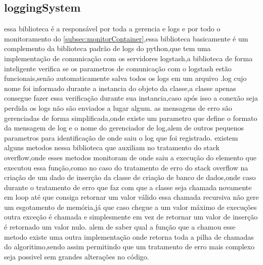 \documentclass[
	12pt,				%
	openright,			%
	oneside,			%
	a4paper,			%
	english,			%
	french,				%
	spanish,			%
	brazil,				%
	]{abntex2}
\begin{document}
\subsection{loggingSystem}
\label{subsec:loggingSystem}
essa biblioteca é a responsável por toda a gerencia e logs e por todo o monitoramento do \autoref{subsec:monitorContainer},essa biblioteca basicamente é um complemento da biblioteca padrão de logs do python,que tem uma implementação de comunicação com os servidores logstash,a biblioteca de forma inteligente verifica se os parametros de comunicação com o logstash estão funcionais,senão automaticamente salva todos os logs em um arquivo .log cujo nome foi informado durante a instancia do objeto da classe,a classe apenas consegue fazer essa verificação durante sua instancia,caso após isso a conexão seja perdida os logs não são enviados a lugar algum.
as mensagens de erro são gerenciadas de forma simplificada,onde existe um parametro que define o formato da mensagem de log e o nome do gerenciador de log,alem de outros pequenos parametros para identificação de onde saiu o log que foi registrado.
existem alguns metodos nessa biblioteca que auxiliam no tratamento do stack overflow,onde esses metodos monitoram de onde saiu a execução do elemento que executou essa função,como no caso do tratamento de erro do stack overflow na criação de um dado de inserção da classe de criação de banco de dados,onde caso durante o tratamento de erro que faz com que a classe seja chamada novamente em loop até que consiga retornar um valor válido essa chamada recursiva não gere um esgotamento de memória,já que caso chegue a um valor máximo de execuções outra exceção é chamada e simplesmente em vez de retornar um valor de inserção é retornado um valor nulo.
alem de saber qual a função que a chamou esse metodo existe uma outra implementação onde retorna toda a pilha de chamadas do algoritimo,sendo assim permitindo que um tratamento de erro mais complexo seja possivel sem grandes alterações no código.
\end{document}
